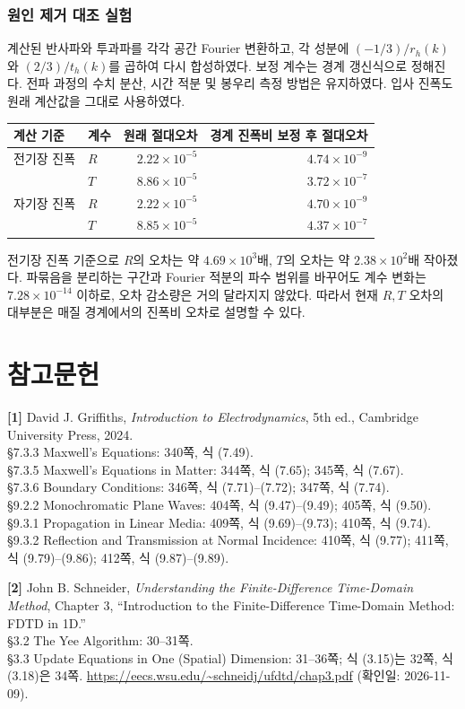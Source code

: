\documentclass[11pt,a4paper]{article}
\newcommand{\sci}[2]{\mathord{#1\times10^{#2}}}
\begin{document}
\subsubsection{원인 제거 대조 실험}
계산된 반사파와 투과파를 각각 공간 Fourier 변환하고,
각 성분에 $(-1/3)/r_h(k)$와 $(2/3)/t_h(k)$를 곱하여 다시 합성하였다. 보정 계수는 경계 갱신식으로 정해진다.
전파 과정의 수치 분산, 시간 적분 및 봉우리 측정 방법은 유지하였다.
입사 진폭도 원래 계산값을 그대로 사용하였다.
\begin{center}\small\renewcommand{\arraystretch}{1.3}
\begin{tabular}{llrr}\toprule
계산 기준 & 계수 & 원래 절대오차 & 경계 진폭비 보정 후 절대오차\\\midrule
전기장 진폭 & $R$ & $\sci{2.22}{-5}$ & $\sci{4.74}{-9}$\\
 & $T$ & $\sci{8.86}{-5}$ & $\sci{3.72}{-7}$\\
자기장 진폭 & $R$ & $\sci{2.22}{-5}$ & $\sci{4.70}{-9}$\\
 & $T$ & $\sci{8.85}{-5}$ & $\sci{4.37}{-7}$\\\bottomrule
\end{tabular}\end{center}
전기장 진폭 기준으로 $R$의 오차는 약 $\sci{4.69}{3}$배,
$T$의 오차는 약 $\sci{2.38}{2}$배 작아졌다.
파묶음을 분리하는 구간과 Fourier 적분의 파수 범위를 바꾸어도 계수 변화는
$\sci{7.28}{-14}$ 이하로, 오차 감소량은 거의 달라지지 않았다.
따라서 현재 $R,T$ 오차의 대부분은 매질 경계에서의 진폭비 오차로 설명할 수 있다.

\newpage\section*{참고문헌}
\begingroup\small
\textbf{[1]} David J. Griffiths, \textit{Introduction to Electrodynamics},
5th ed., Cambridge University Press, 2024.\\
§7.3.3 Maxwell's Equations: 340쪽, 식 (7.49).\\
§7.3.5 Maxwell's Equations in Matter: 344쪽, 식 (7.65); 345쪽, 식 (7.67).\\
§7.3.6 Boundary Conditions: 346쪽, 식 (7.71)--(7.72); 347쪽, 식 (7.74).\\
§9.2.2 Monochromatic Plane Waves: 404쪽, 식 (9.47)--(9.49); 405쪽, 식 (9.50).\\
§9.3.1 Propagation in Linear Media: 409쪽, 식 (9.69)--(9.73); 410쪽, 식 (9.74).\\
§9.3.2 Reflection and Transmission at Normal Incidence: 410쪽, 식 (9.77);
411쪽, 식 (9.79)--(9.86); 412쪽, 식 (9.87)--(9.89).

\textbf{[2]} John B. Schneider, \textit{Understanding the Finite-Difference
Time-Domain Method}, Chapter 3, ``Introduction to the Finite-Difference
Time-Domain Method: FDTD in 1D.''\\
§3.2 The Yee Algorithm: 30--31쪽.\\
§3.3 Update Equations in One (Spatial) Dimension: 31--36쪽;
식 (3.15)는 32쪽, 식 (3.18)은 34쪽.
\url{https://eecs.wsu.edu/~schneidj/ufdtd/chap3.pdf}
(확인일: 2026-11-09).
\endgroup
\end{document}
